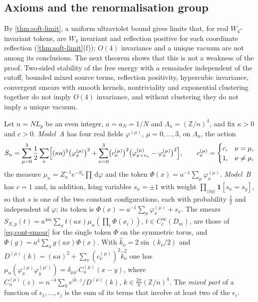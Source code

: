 \documentclass[11pt,a4paper]{amsart}
\theoremstyle{definition}
\theoremstyle{remark}
\numberwithin{equation}{section}
\newcommand{\Z}{\mathbb{Z}}          %
\newcommand{\dd}{\,\mathrm{d}}             %
\newcommand{\aN}{a_N}                      %
\newcommand{\Lp}{L_p}                      %
\begin{document}
\subsection{Axioms and the renormalisation group}

By \cref{thm:soft-limit}, a uniform ultraviolet bound gives limits that, for real $W_4$-invariant tokens, are $W_4$ invariant and reflection positive for each coordinate reflection (\cref{thm:soft-limit}(f)); $O(4)$ invariance and a unique vacuum are not among its conclusions. The next theorem shows that this is not a weakness of the proof. Two-sided stability of the free energy with a remainder independent of the cutoff, bounded mixed source terms, reflection positivity, hypercubic invariance, convergent smears with smooth kernels, nontriviality and exponential clustering together do not imply $O(4)$ invariance, and without clustering they do not imply a unique vacuum.

Let $n=N\Lp$ be an even integer, $a=\aN=1/N$ and $\Lambda_n=(\Z/n)^4$, and fix $\kappa>0$ and $c>0$. \emph{Model~A} has four real fields $\varphi^{(\mu)}$, $\mu=0,\dots,3$, on $\Lambda_n$, the action
\begin{equation}\label{eq:model-A}
S_n=\sum_{\mu=0}^3\frac12\sum_x\Bigl[(\kappa a)^2\bigl(\varphi^{(\mu)}_x\bigr)^2+\sum_{\nu=0}^3\bigl(c^{(\mu)}_\nu\bigr)^2\bigl(\varphi^{(\mu)}_{x+e_\nu}-\varphi^{(\mu)}_x\bigr)^2\Bigr],\qquad c^{(\mu)}_\nu=\begin{cases}c,&\nu=\mu,\\1,&\nu\ne\mu,\end{cases}
\end{equation}
the measure $\mu_n=Z_n^{-1}e^{-S_n}\prod\dd\varphi$ and the token $\Phi(x)=a^{-1}\sum_\mu\varphi^{(\mu)}_x$. \emph{Model~B} has $c=1$ and, in addition, Ising variables $s_x=\pm1$ with weight $\prod_{\langle xy\rangle}\mathbf 1[s_x=s_y]$, so that $s$ is one of the two constant configurations, each with probability $\frac12$ and independent of $\varphi$; its token is $\Phi(x)=a^{-1}\sum_\mu\varphi^{(\mu)}_x+s_x$. The smears $S_{N,p}(t)=a^{4m}\sum_xt(ax)\mu_n(\prod_i\Phi(x_i))$, $t\in C^\infty_c(D_m)$, are those of \eqref{eq:cont-smear} for the single token $\Phi$ on the symmetric torus, and $\Phi(g)=a^4\sum_xg(ax)\Phi(x)$. With $\hat k_\nu=2\sin(k_\nu/2)$ and $D^{(\mu)}(k)=(\kappa a)^2+\sum_\nu(c^{(\mu)}_\nu)^2\hat k_\nu^2$ one has $\mu_n(\varphi^{(\mu)}_x\varphi^{(\mu')}_y)=\delta_{\mu\mu'}C^{(\mu)}_n(x-y)$, where $C^{(\mu)}_n(z)=n^{-4}\sum_ke^{ik\cdot z}/D^{(\mu)}(k)$, $k\in\frac{2\pi}n(\Z/n)^4$. The \emph{mixed part} of a function of $\epsilon_1,\dots,\epsilon_j$ is the sum of its terms that involve at least two of the $\epsilon_i$.
\end{document}
